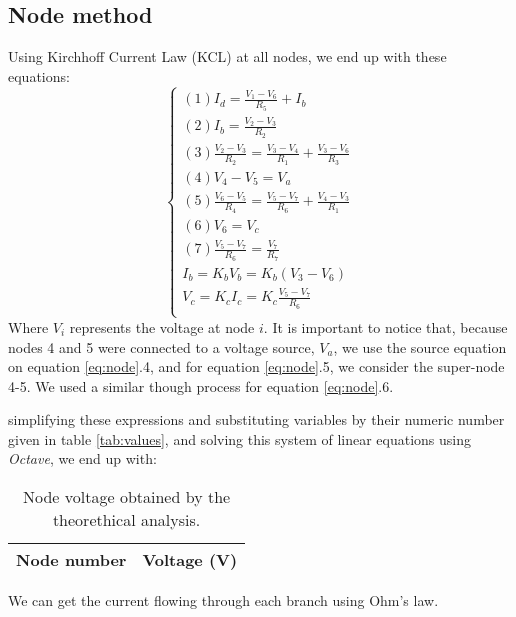 \subsection{Node method}
Using Kirchhoff Current Law (KCL) at all nodes, we end up with these equations:
\begin{equation}\label{eq:node}
  \begin{cases}
  (1) I_d = \frac{V_1 - V_6}{R_5} + I_b \\
  (2) I_b = \frac{V_2 - V_3}{R_2} \\
  (3) \frac{V_2 - V_3}{R_2} = \frac{V_3 - V_4}{R_1} + \frac{V_3 - V_6}{R_3} \\
  (4) V_4 - V_5 = V_a \\
  (5) \frac{V_6 - V_5}{R_4} = \frac{V_5 - V_7}{R_6} + \frac{V_4 - V_3}{R_1} \\ %
  (6) V_6 = V_c \\
  (7) \frac{V_5 - V_7}{R_6} = \frac{V_7}{R_7} \\
  I_b = K_bV_b = K_b(V_3 - V_6) \\
  V_c = K_cI_c = K_c \frac{V_5 - V_7}{R_6} \\
\end{cases}
\end{equation}
Where $V_i$ represents the voltage at node $i$. It is important to notice that, because nodes 4 and 5 were connected to a voltage source, $V_a$, we use the source equation on equation \ref{eq:node}.4, and for equation \ref{eq:node}.5, we consider the super-node 4-5. We used a similar though process for equation \ref{eq:node}.6.
\par
simplifying these expressions and substituting variables by their numeric number given in table \ref{tab:values}, and solving this system of linear equations using \textit{Octave}, we end up with:
\begin{table}[H]
  \centering
  \begin{tabular}{|l|r|}
    \hline    
    {\bf Node number} & {\bf Voltage (V)} \\ \hline
    
  \end{tabular}
  \caption{Node voltage obtained by the theorethical analysis.}
  \label{tab:node}
\end{table}
\par
We can get the current flowing through each branch using Ohm's law.

